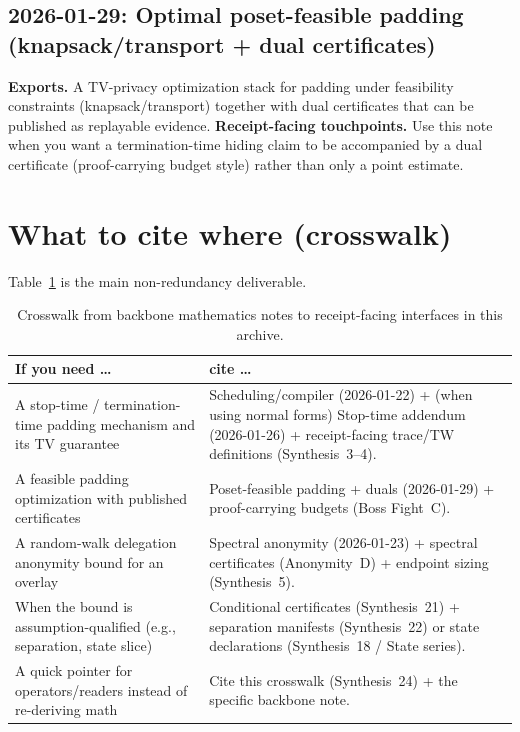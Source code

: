 \documentclass[11pt]{article}
\begin{document}
\subsection{2026-01-29: Optimal poset-feasible padding (knapsack/transport + dual certificates)}
\textbf{Exports.}
A TV-privacy optimization stack for padding under feasibility constraints (knapsack/transport) together with dual certificates that can be published as replayable evidence.
\textbf{Receipt-facing touchpoints.} Use this note when you want a termination-time hiding claim to be accompanied by a dual certificate (proof-carrying budget style) rather than only a point estimate.\cite{wiki:knapsack,series:pcbudgets}

\section{What to cite where (crosswalk)}
Table~\ref{tab:crosswalk} is the main non-redundancy deliverable.

\begin{table}[t]
\centering
\small
\begin{tabularx}{\linewidth}{@{}lX@{}}
\toprule
If you need \dots & cite \dots \\
\midrule
A stop-time / termination-time padding mechanism and its TV guarantee & Scheduling/compiler (2026-01-22) + (when using normal forms) Stop-time addendum (2026-01-26) + receipt-facing trace/TW definitions (Synthesis~3--4). \\
A feasible padding optimization with published certificates & Poset-feasible padding + duals (2026-01-29) + proof-carrying budgets (Boss Fight~C). \\
A random-walk delegation anonymity bound for an overlay & Spectral anonymity (2026-01-23) + spectral certificates (Anonymity~D) + endpoint sizing (Synthesis~5). \\
When the bound is assumption-qualified (e.g., separation, state slice) & Conditional certificates (Synthesis~21) + separation manifests (Synthesis~22) or state declarations (Synthesis~18 / State series). \\
A quick pointer for operators/readers instead of re-deriving math & Cite this crosswalk (Synthesis~24) + the specific backbone note. \\
\bottomrule
\end{tabularx}
\caption{Crosswalk from backbone mathematics notes to receipt-facing interfaces in this archive.}
\label{tab:crosswalk}
\end{table}
\end{document}

